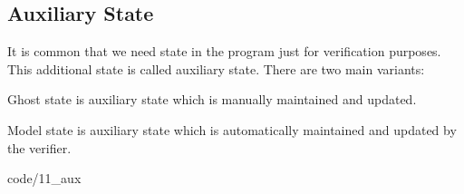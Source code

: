 \subsection{Auxiliary State}
\begin{mytitle} It is common that we need state in the program just for verification purposes. This additional state is called auxiliary state. There are two main variants:
    \begin{mysubtitle} Ghost state is auxiliary state which is manually maintained and updated.
    \end{mysubtitle}
    \begin{mysubtitle} Model state is auxiliary state which is automatically maintained and updated by the verifier.
    \end{mysubtitle}
\end{mytitle}
 {code/11_aux}
